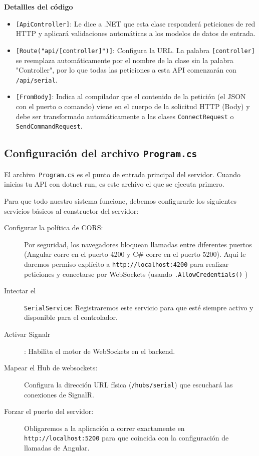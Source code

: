 \documentclass[
10pt, %
a4paper, %
oneside, %
headinclude,footinclude, %
BCOR5mm, %
]{scrartcl}
\begin{document}
\textbf{Detallles del código}\\
\begin{itemize}
	\item \texttt{[ApiController]}: Le dice a .NET que esta clase responderá peticiones de red HTTP y aplicará validaciones automáticas a los modelos de datos de entrada.
	\item \texttt{[Route("api/[controller]")]}: Configura la URL. La palabra \texttt{[controller]} se reemplaza automáticamente por el nombre de la clase sin la palabra "Controller", por lo que todas las peticiones a esta API comenzarán con \texttt{/api/serial}.
	\item \texttt{[FromBody]}: Indica al compilador que el contenido de la petición (el JSON con el puerto o comando) viene en el cuerpo de la solicitud HTTP (Body) y debe ser transformado automáticamente a las clases \texttt{ConnectRequest} o \texttt{SendCommandRequest}.
\end{itemize}

\subsection{Configuración del archivo \texttt{Program.cs}}
El archivo\texttt{ Program.cs} es el punto de entrada principal del servidor. Cuando inicias tu API con dotnet run, es este archivo el que se ejecuta primero.

Para que todo nuestro sistema funcione, debemos configurarle los siguientes servicios básicos al constructor del servidor:

\begin{description}
	\item[Configurar la política de CORS:] Por seguridad, los navegadores bloquean llamadas entre diferentes puertos (Angular corre en el puerto 4200 y C\# corre en el puerto 5200). Aquí le daremos permiso explícito a \texttt{http://localhost:4200} para realizar peticiones y conectarse por WebSockets (usando \texttt{.AllowCredentials()} )
	\item[Intectar el] \texttt{SerialService}: Registraremos este servicio para que esté siempre activo y disponible para el controlador.
	\item[Activar Signalr]: Habilita el motor de WebSockets en el backend.
	\item[Mapear el Hub de websockets:] Configura la dirección URL física (\texttt{/hubs/serial}) que escuchará las conexiones de SignalR.
	\item[Forzar el puerto del servidor:] Obligaremos a la aplicación a correr exactamente en \texttt{http://localhost:5200} para que coincida con la configuración de llamadas de Angular.
\end{description}
\end{document}
